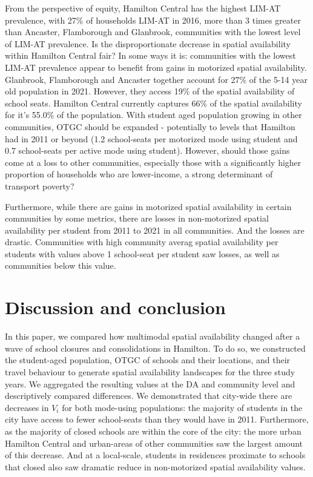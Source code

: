 \documentclass[
default
]{sn-jnl}
\begin{document}
From the perspective of equity, Hamilton Central has the highest LIM-AT
prevalence, with 27\% of households LIM-AT in 2016, more than 3 times
greater than Ancaster, Flamborough and Glanbrook, communities with the
lowest level of LIM-AT prevalence. Is the disproportionate decrease in
spatial availability within Hamilton Central fair? In some ways it is:
communities with the lowest LIM-AT prevalence appear to benefit from
gains in motorized spatial availability. Glanbrook, Flamborough and
Ancaster together account for 27\% of the 5-14 year old population in
2021. However, they access 19\% of the spatial availability of school
seats. Hamilton Central currently captures 66\% of the spatial
availability for it's 55.0\% of the population. With student aged
population growing in other communities, OTGC should be expanded -
potentially to levels that Hamilton had in 2011 or beyond (1.2
school-seats per motorized mode using student and 0.7 school-seats per
active mode using student). However, should those gains come at a loss
to other communities, especially those with a significantly higher
proportion of households who are lower-income, a strong determinant of
transport poverty?

Furthermore, while there are gains in motorized spatial availability in
certain communities by some metrics, there are losses in non-motorized
spatial availability per student from 2011 to 2021 in all communities.
And the losses are drastic. Communities with high community averag
spatial availability per students with values above 1 school-seat per
student saw losses, as well as communities below this value.

\section{Discussion and conclusion}\label{discussion-and-conclusion}

In this paper, we compared how multimodal spatial availability changed
after a wave of school closures and consolidations in Hamilton. To do
so, we constructed the student-aged population, OTGC of schools and
their locations, and their travel behaviour to generate spatial
availability landscapes for the three study years. We aggregated the
resulting values at the DA and community level and descriptively
compared differences. We demonstrated that city-wide there are decreases
in \(V_i\) for both mode-using populations: the majority of students in
the city have access to fewer school-seats than they would have in 2011.
Furthermore, as the majority of closed schools are within the core of
the city: the more urban Hamilton Central and urban-areas of other
communities saw the largest amount of this decrease. And at a
local-scale, students in residences proximate to schools that closed
also saw dramatic reduce in non-motorized spatial availability values.
\end{document}
